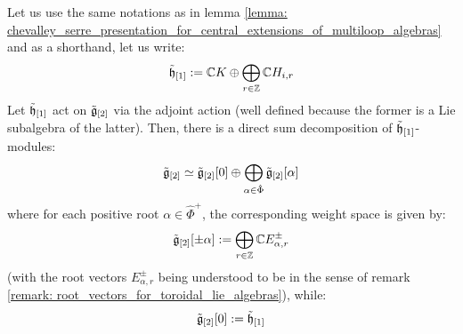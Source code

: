         \begin{proposition}
            Let us use the same notations as in lemma \ref{lemma: chevalley_serre_presentation_for_central_extensions_of_multiloop_algebras} and as a shorthand, let us write:
                $$\tilde{\mathfrak{h}}_{[1]} := \mathbb{C} K \oplus \bigoplus_{r \in \mathbb{Z}} \mathbb{C} H_{i, r}$$
            Let $\tilde{\mathfrak{h}}_{[1]}$ act on $\tilde{\mathfrak{g}}_{[2]}$ via the adjoint action (well defined because the former is a Lie subalgebra of the latter). Then, there is a direct sum decomposition of $\tilde{\mathfrak{h}}_{[1]}$-modules:
                $$\tilde{\mathfrak{g}}_{[2]} \simeq \tilde{\mathfrak{g}}_{[2]}[0] \oplus \bigoplus_{\alpha \in \hat{\Phi}} \tilde{\mathfrak{g}}_{[2]}[\alpha]$$
            where for each positive root $\alpha \in \hat{\Phi}^+$, the corresponding weight space is given by:
                $$\tilde{\mathfrak{g}}_{[2]}[\pm \alpha] := \bigoplus_{r \in \mathbb{Z}} \mathbb{C} E_{\alpha, r}^{\pm}$$
            (with the root vectors $E_{\alpha, r}^{\pm}$ being understood to be in the sense of remark \ref{remark: root_vectors_for_toroidal_lie_algebras}), while:
                $$\tilde{\mathfrak{g}}_{[2]}[0] := \tilde{\mathfrak{h}}_{[1]}$$
        \end{proposition}
